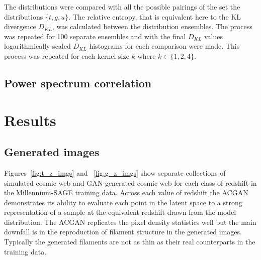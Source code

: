 \documentclass[twocolumn]{article}
\numberwithin{equation}{section}
\begin{document}
The distributions were compared with all the possible pairings of the set the distributions $\{ t, g, u\}$. The relative 
entropy, that is equivalent here to the KL divergence $D_{KL}$, was calculated between the distribution ensembles. The 
process was repeated for 100 separate ensembles and with the final $D_{KL}$ values logarithmically-scaled $D_{KL}$ 
histograms for each comparison were made. This process was repeated for each kernel size $k$ where $k \in \{1, 2, 4\}$.


\subsection{Power spectrum correlation}



\section{Results}\label{sec:results}



\subsection{Generated images}
Figures~\ref{fig:t_z_imgs} and ~\ref{fig:g_z_imgs} show separate collections of simulated cosmic web and GAN-generated 
cosmic web for each class of redshift in the Millennium-SAGE training data. Across each value of redshift the ACGAN 
demonstrates its ability to evaluate each point in the latent space to a strong representation of a sample at the equivalent
redshift drawn from the model distribution. The ACGAN replicates the pixel density statistics well but the main downfall is 
in the reproduction of filament structure in the generated images. Typically the generated filaments are not as thin as their 
real counterparts in the training data. 
\end{document}
